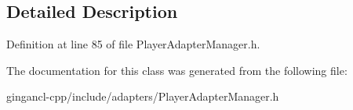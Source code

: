 \subsection{Detailed Description}




Definition at line 85 of file PlayerAdapterManager.h.

The documentation for this class was generated from the following file:\begin{CompactItemize}
\item 
gingancl-cpp/include/adapters/PlayerAdapterManager.h\end{CompactItemize}
